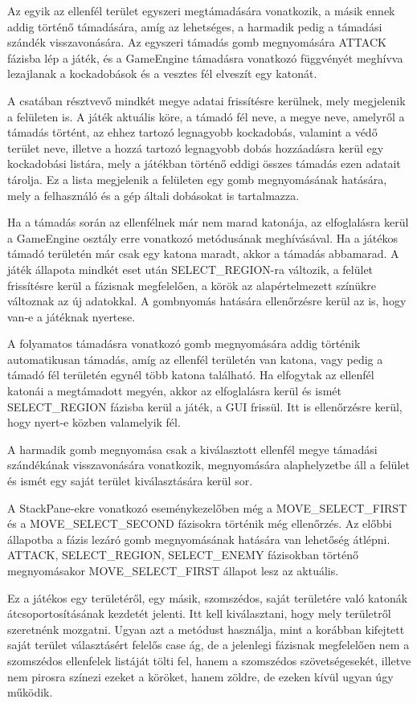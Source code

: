 Az egyik az ellenfél terület egyszeri megtámadására vonatkozik, a másik ennek addig történő támadására, amíg az lehetséges, a harmadik pedig a támadási szándék visszavonására. Az egyszeri támadás gomb megnyomására ATTACK fázisba lép a játék, és a GameEngine támadásra vonatkozó függvényét meghívva lezajlanak a kockadobások és a vesztes fél elveszít egy katonát. 

A csatában résztvevő mindkét megye adatai frissítésre kerülnek, mely megjelenik a felületen is. A játék aktuális köre, a támadó fél neve, a megye neve, amelyről a támadás történt, az ehhez tartozó legnagyobb kockadobás, valamint a védő terület neve, illetve a hozzá tartozó legnagyobb dobás hozzáadásra kerül egy kockadobási listára, mely a játékban történő eddigi összes támadás ezen adatait tárolja. Ez a lista megjelenik a felületen egy gomb megnyomásának hatására, mely a felhasználó és a gép általi dobásokat is tartalmazza. 

Ha a támadás során az ellenfélnek már nem marad katonája, az elfoglalásra kerül a GameEngine osztály erre vonatkozó metódusának meghívásával. Ha a játékos támadó területén már csak egy katona maradt, akkor a támadás abbamarad. A játék állapota mindkét eset után SELECT\_REGION-ra változik, a felület frissítésre kerül a fázisnak megfelelően, a körök az alapértelmezett színükre változnak az új adatokkal. A gombnyomás hatására ellenőrzésre kerül az is, hogy van-e a játéknak nyertese. 

A folyamatos támadásra vonatkozó gomb megnyomására addig történik automatikusan támadás, amíg az ellenfél területén van katona, vagy pedig a támadó fél területén egynél több katona található. Ha elfogytak az ellenfél katonái a megtámadott megyén, akkor az elfoglalásra kerül és ismét SELECT\_REGION fázisba kerül a játék, a GUI frissül. Itt is ellenőrzésre kerül, hogy nyert-e közben valamelyik fél. 

A harmadik gomb megnyomása csak a kiválasztott ellenfél megye támadási szándékának visszavonására vonatkozik, megnyomására alaphelyzetbe áll a felület és ismét egy saját terület kiválasztására kerül sor. 

A StackPane-ekre vonatkozó eseménykezelőben még a MOVE\_SELECT\_FIRST és a MOVE\_SELECT\_SECOND fázisokra történik még ellenőrzés. Az előbbi állapotba a fázis lezáró gomb megnyomásának hatására van lehetőség átlépni. ATTACK, SELECT\_REGION, SELECT\_ENEMY fázisokban történő megnyomásakor MOVE\_SELECT\_FIRST állapot lesz az aktuális. 

Ez a játékos egy területéről, egy másik, szomszédos, saját területére való katonák átcsoportosításának kezdetét jelenti. Itt kell kiválasztani, hogy mely területről szeretnénk mozgatni. Ugyan azt a metódust használja, mint a korábban kifejtett saját terület választásért felelős case ág, de a jelenlegi fázisnak megfelelően nem a szomszédos ellenfelek listáját tölti fel, hanem a szomszédos szövetségesekét, illetve nem pirosra színezi ezeket a köröket, hanem zöldre, de ezeken kívül ugyan úgy működik. 

